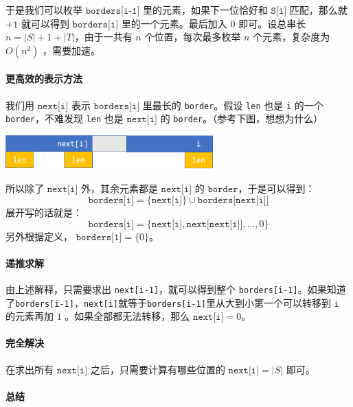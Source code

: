 \documentclass{article}
\begin{document}
于是我们可以枚举 $\texttt{borders[i-1]}$ 里的元素，如果下一位恰好和 $\texttt{S[i]}$ 匹配，那么就 $\texttt{+1}$ 就可以得到 $\texttt{borders[i]}$ 里的一个元素。最后加入 $0$ 即可。设总串长 $n = |S|+1+|T|$，由于一共有 $n$ 个位置，每次最多枚举 $n$ 个元素，复杂度为 $O(n^2)$ ，需要加速。

\dotfill

\paragraph{更高效的表示方法}我们用 $\texttt{next[i]}$ 表示 $\texttt{borders[i]}$ 里最长的 \texttt{border}。假设 \texttt{len} 也是 \texttt{i} 的一个 \texttt{border}，不难发现 \texttt{len} 也是 $\texttt{next[i]}$ 的 \texttt{border}。（参考下图，想想为什么）

\begin{center}
\includegraphics[width=8cm]{2.png}
\end{center}

所以除了 $\texttt{next[i]}$ 外，其余元素都是 $\texttt{next[i]}$ 的 $\texttt{border}$，于是可以得到：
    $$\texttt{borders[i]} = \{\texttt{next[i]}\} \cup \texttt{borders[next[i]]}$$
展开写的话就是：
    $$\texttt{borders[i]} = \{\texttt{next[i]},\texttt{next[next[i]]},\ldots,0\}$$
另外根据定义， $\texttt{borders[1]} = \{0\}$。

\dotfill

\paragraph{递推求解} 由上述解释，只需要求出 \texttt{next[i-1]}，就可以得到整个 \texttt{borders[i-1]}。如果知道了\texttt{borders[i-1]}，\texttt{next[i]}就等于\texttt{borders[i-1]}里从大到小第一个可以转移到 $\texttt{i}$ 的元素再加 $1$  。如果全部都无法转移，那么 $\texttt{next[i]} = 0$。

\dotfill

\paragraph{完全解决} 

在求出所有 $\texttt{next[i]}$ 之后，只需要计算有哪些位置的 $\texttt{next[i]} = |S|$ 即可。

\dotfill

\paragraph{总结} 
\end{document}
